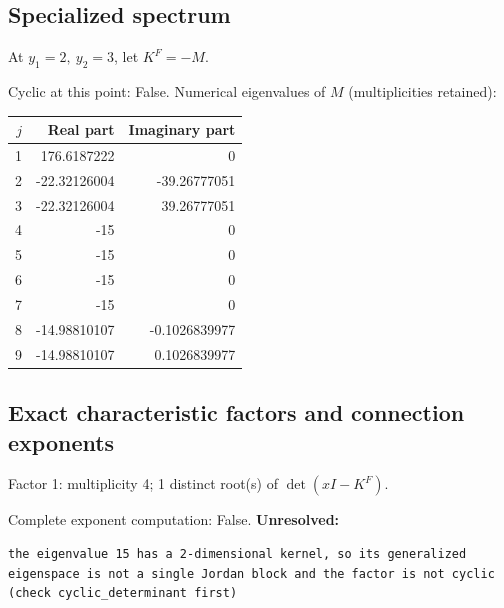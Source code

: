 \documentclass[10pt,a4paper]{article}
\newcommand{\fitmath}[1]{\sbox{\mathbox}{$\displaystyle #1$}\ifdim\wd\mathbox>\linewidth\resizebox{\linewidth}{!}{\usebox{\mathbox}}\else\usebox{\mathbox}\fi}
\begin{document}
\subsection*{Specialized spectrum}
At $y_1=2,\ y_2=3$, let $K^F=-M$.
\begin{center}\fitmath{\Delta=0}\end{center}
Cyclic at this point: False.
Numerical eigenvalues of $M$ (multiplicities retained):
\begin{center}\small\begin{tabular}{rrr}\toprule $j$ & Real part & Imaginary part\\\midrule
1 & 176.6187222 & 0\\
2 & -22.32126004 & -39.26777051\\
3 & -22.32126004 & 39.26777051\\
4 & -15 & 0\\
5 & -15 & 0\\
6 & -15 & 0\\
7 & -15 & 0\\
8 & -14.98810107 & -0.1026839977\\
9 & -14.98810107 & 0.1026839977\\
\bottomrule\end{tabular}\end{center}
\subsection*{Exact characteristic factors and connection exponents}
Factor 1: multiplicity 4; 1 distinct root(s) of $\det(xI-K^F)$.
\begin{center}\fitmath{\begin{aligned}p_{1}(x)&=x - 15\end{aligned}}\end{center}
Complete exponent computation: False.
\textbf{Unresolved:}

\begin{lstlisting}
the eigenvalue 15 has a 2-dimensional kernel, so its generalized eigenspace is not a single Jordan block and the factor is not cyclic (check cyclic_determinant first)
\end{lstlisting}
\end{document}
